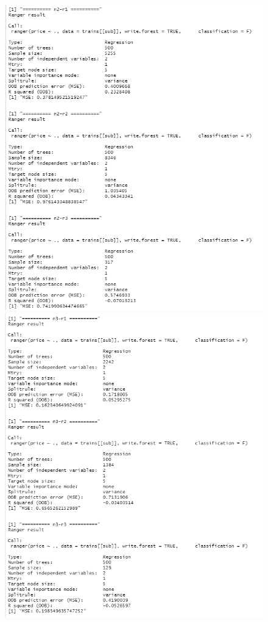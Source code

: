 \documentclass{FR16}
\begin{document}
\begin{figure}[!htb]
\begin{minipage}{0.48\textwidth}
     \includegraphics[width=1\linewidth]{figures/rgn2.2.png}
   \end{minipage}
   \begin{minipage}{0.48\textwidth}
     \centering
     \includegraphics[width=1\linewidth]{figures/rgn2.3.png} 
   \end{minipage}\hfill
   
\end{figure}
\end{document}
